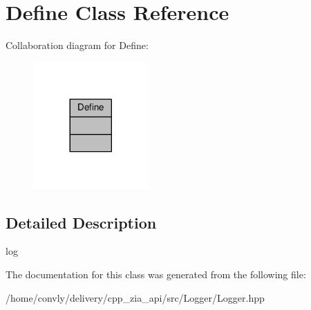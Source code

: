 \hypertarget{classDefine}{}\section{Define Class Reference}
\label{classDefine}


Collaboration diagram for Define\+:\nopagebreak
\begin{figure}[H]
\begin{center}
\leavevmode
\includegraphics[width=125pt]{classDefine__coll__graph}
\end{center}
\end{figure}


\subsection{Detailed Description}
log 

The documentation for this class was generated from the following file\+:\begin{DoxyCompactItemize}
\item 
/home/convly/delivery/cpp\+\_\+zia\+\_\+api/src/\+Logger/Logger.\+hpp\end{DoxyCompactItemize}
